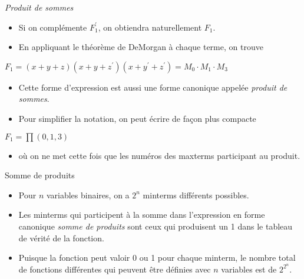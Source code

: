 \documentclass[presentation]{beamer}
\begin{document}
\begin{frame}[label={sec:org666dd40}]{\emph{Produit de sommes}}
\begin{itemize}
\item Si on complémente \(F_1^\prime\), on obtiendra naturellement \(F_1\).

\item En appliquant le théorème de DeMorgan à chaque terme, on trouve
\end{itemize}

\(F_1 = (x+ y+ z)(x + y + z^\prime)(x + y^\prime + z^\prime) = M_0
\cdot M_1 \cdot M_3\)

\begin{itemize}
\item Cette forme d'expression est aussi une forme canonique appelée \emph{produit de sommes}.

\item Pour simplifier la notation, on peut écrire de façon plus compacte
\end{itemize}

\(F_1 = \prod (0,1,3)\)

\begin{itemize}
\item où on ne met cette fois que les numéros des maxterms participant au produit.
\end{itemize}
\end{frame}

\begin{frame}[label={sec:org72fd7b9}]{Somme de produits}
\begin{itemize}
\item Pour \(n\) variables binaires, on a \(2^n\) minterms différents possibles.

\item Les minterms qui participent à la somme dans l'expression en forme canonique \emph{somme de produits} sont ceux qui produisent un 1 dans le tableau de vérité de la fonction.

\item Puisque la fonction peut valoir 0 ou 1 pour chaque minterm, le nombre total de fonctions différentes qui peuvent être définies avec \(n\) variables est de \(2^{2^n}\).
\end{itemize}
\end{frame}
\end{document}
